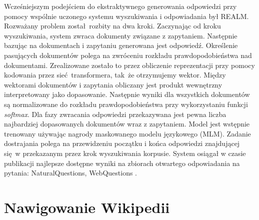 Wcześniejszym podejściem do ekstraktywnego generowania odpowiedzi przy pomocy wspólnie uczonego systemu wyszukiwania i odpowiadania był REALM.  
Rozważany problem został rozbity na dwa kroki. Zaczynając od kroku wyszukiwania, system zwraca dokumenty związane z zapytaniem. Następnie bazując na dokumentach i zapytaniu generowana jest odpowiedź. Określenie pasujących dokumentów polega na zwróceniu rozkładu prawdopodobieństwa nad dokumentami. Zrealizowane zostało to przez obliczenie reprezentacji przy pomocy kodowania przez sieć transformera, tak że otrzymujemy wektor. Między wektorami dokumentów i zapytania obliczany jest produkt wewnętrzny interpretowany jako dopasowanie. Następnie wyniki dla wszystkich dokumentów są normalizowane do rozkładu prawdopodobieństwa przy wykorzystaniu funkcji \emph{softmax}. Dla fazy zwracania odpowiedzi przekazywana jest pewna liczba najbardziej dopasowanych dokumentów wraz z zapytaniem. Model jest wstępnie trenowany używając nagrody maskowanego modelu językowego (MLM). Zadanie dostrajania polega na przewidzeniu początku i końca odpowiedzi znajdującej się w przekazanym przez krok wyszukiwania korpusie. System osiągał w czasie publikacji najlepsze dostępne wyniki na zbiorach otwartego odpowiadania na pytania: NaturalQuestions,  WebQuestions \autocite{guu2020realm}.

\section{Nawigowanie Wikipedii}


